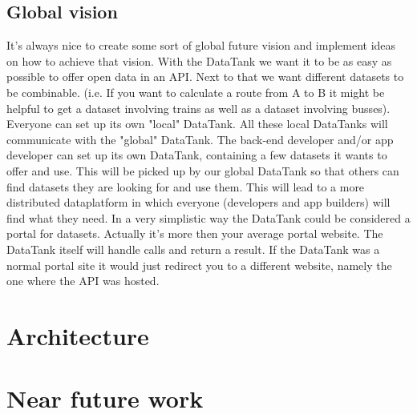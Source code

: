 \documentclass[12pt]{article}
\begin{document}
\subsection{Global vision} 
\npar It's always nice to create some sort of global future vision and implement ideas on how to achieve that vision. With the DataTank we want it to be as easy as possible to offer open data in an API. Next to that we want different datasets to be combinable. (i.e. If you want to calculate a route from A to B it might be helpful to get a dataset involving trains as well as a dataset involving busses). 
\npar Everyone can set up its own "local" DataTank. All these local DataTanks will communicate with the "global" DataTank. The back-end developer and/or app developer can set up its own DataTank, containing a few datasets it wants to offer and use. This will be picked up by our global DataTank so that others can find datasets they are looking for and use them. This will lead to a more distributed dataplatform in which everyone (developers and app builders) will find what they need. In a very simplistic way the DataTank could be considered a portal for datasets. Actually it's more then your average portal website. The DataTank itself will handle calls and return a result. If the DataTank was a normal portal site it would just redirect you to a different website, namely the one where the API was hosted.

\section{Architecture}

\section{Near future work}
\end{document}
